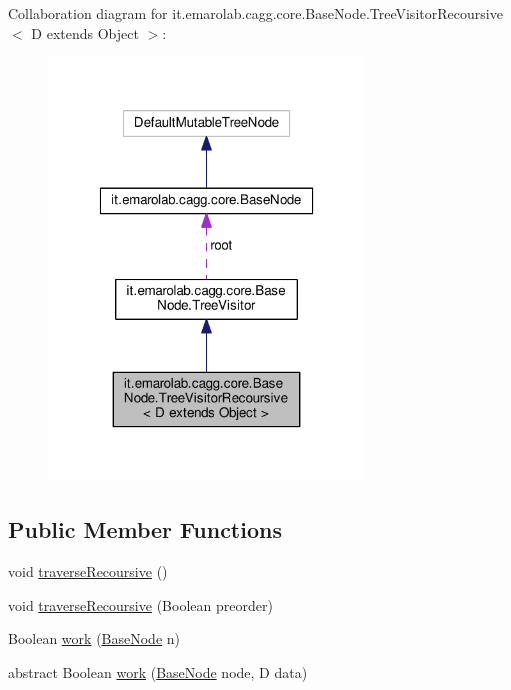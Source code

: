 Collaboration diagram for it.\-emarolab.\-cagg.\-core.\-Base\-Node.\-Tree\-Visitor\-Recoursive$<$ D extends Object $>$\-:\nopagebreak
\begin{figure}[H]
\begin{center}
\leavevmode
\includegraphics[width=238pt]{classit_1_1emarolab_1_1cagg_1_1core_1_1BaseNode_1_1TreeVisitorRecoursive_3_01D_01extends_01Object_01_4__coll__graph}
\end{center}
\end{figure}
\subsection*{Public Member Functions}
\begin{DoxyCompactItemize}
\item 
void \hyperlink{classit_1_1emarolab_1_1cagg_1_1core_1_1BaseNode_1_1TreeVisitorRecoursive_3_01D_01extends_01Object_01_4_a60f380f61f38af27ce662c738f7c879c}{traverse\-Recoursive} ()
\item 
void \hyperlink{classit_1_1emarolab_1_1cagg_1_1core_1_1BaseNode_1_1TreeVisitorRecoursive_3_01D_01extends_01Object_01_4_a961171b96b320db51f85067e0567404e}{traverse\-Recoursive} (Boolean preorder)
\item 
Boolean \hyperlink{classit_1_1emarolab_1_1cagg_1_1core_1_1BaseNode_1_1TreeVisitorRecoursive_3_01D_01extends_01Object_01_4_a0edd29ba6e970d5563ef14cd644927f7}{work} (\hyperlink{classit_1_1emarolab_1_1cagg_1_1core_1_1BaseNode}{Base\-Node} n)
\item 
abstract Boolean \hyperlink{classit_1_1emarolab_1_1cagg_1_1core_1_1BaseNode_1_1TreeVisitorRecoursive_3_01D_01extends_01Object_01_4_a016fb0e90095528c495bebfa95ab2acc}{work} (\hyperlink{classit_1_1emarolab_1_1cagg_1_1core_1_1BaseNode}{Base\-Node} node, D data)
\end{DoxyCompactItemize}

